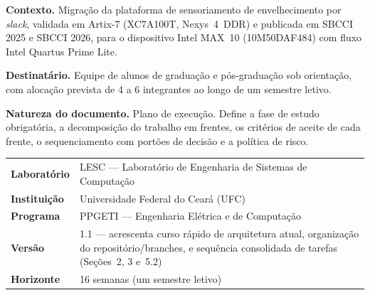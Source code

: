 \documentclass[11pt,a4paper]{article}
\begin{document}
\begin{titlepage}
\thispagestyle{empty}
\vspace*{1.2cm}

\noindent{\color{rulegray}\rule{\textwidth}{1.2pt}}
\vspace{0.9cm}


\vspace{0.7cm}

\vspace{0.5cm}
\noindent{\color{rulegray}\rule{\textwidth}{1.2pt}}

\vspace{1.4cm}

\noindent\begin{tcolorbox}[enhanced,colback=lesclight,colframe=lescaccent,boxrule=0.4pt,
  left=12pt,right=12pt,top=10pt,bottom=10pt,arc=2pt]
\small
\textbf{Contexto.} Migração da plataforma de sensoriamento de envelhecimento por
\emph{slack}, validada em Artix-7 (XC7A100T, Nexys~4~DDR) e publicada em SBCCI 2025
e SBCCI 2026, para o dispositivo Intel MAX~10 (10M50DAF484) com fluxo Intel Quartus
Prime Lite.

\vspace{5pt}
\textbf{Destinatário.} Equipe de alunos de graduação e pós-graduação sob orientação,
com alocação prevista de 4 a 6 integrantes ao longo de um semestre letivo.

\vspace{5pt}
\textbf{Natureza do documento.} Plano de execução. Define a fase de estudo obrigatória,
a decomposição do trabalho em frentes, os critérios de aceite de cada frente, o
sequenciamento com portões de decisão e a política de risco.
\end{tcolorbox}

\vfill

\noindent\begin{tabularx}{\textwidth}{@{}lX@{}}
\toprule
\textbf{Laboratório} & LESC --- Laboratório de Engenharia de Sistemas de Computação \\
\textbf{Instituição} & Universidade Federal do Ceará (UFC) \\
\textbf{Programa} & PPGETI --- Engenharia Elétrica e de Computação \\
\textbf{Versão} & 1.1 --- acrescenta curso rápido de arquitetura atual, organização
do repositório/branches, e sequência consolidada de tarefas (Seções~2, 3 e~5.2) \\
\textbf{Horizonte} & 16 semanas (um semestre letivo) \\
\bottomrule
\end{tabularx}

\vspace{0.8cm}
\noindent{\color{rulegray}\rule{\textwidth}{0.8pt}}
\end{titlepage}
\end{document}

